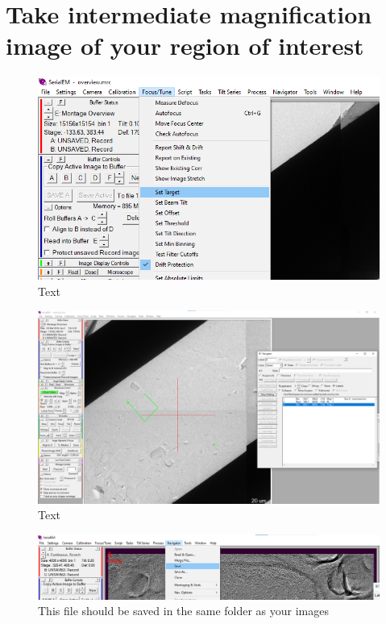 \documentclass[12pt, a4paper]{scrartcl}
\begin{document}
\section{Take intermediate magnification image of your region of interest}

\begin{figure}[H]
\includegraphics[width=\linewidth]{screenshots/TargetDefocus.png}
\caption{Text}
\end{figure}

\begin{figure}[H]
\includegraphics[width=\linewidth]{screenshots/AddPolygon.png}
\caption{Text}
\end{figure}

\begin{figure}[H]
\includegraphics[width=\linewidth]{screenshots/NavigatorSave.png}
\caption{This file should be saved in the same folder as your images}
\end{figure}
\end{document}
